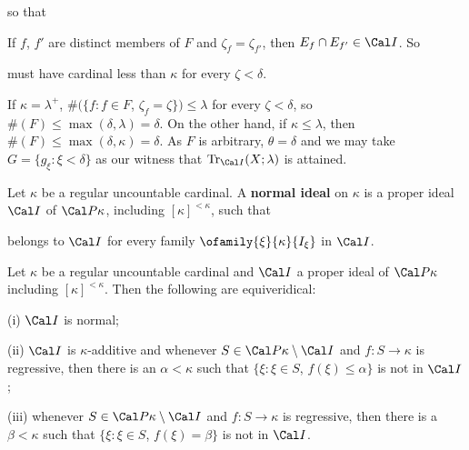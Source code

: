{\noindent so that


If $f$, $f'$ are distinct members of $F$ and $\zeta_f=\zeta_{f'}$,
then $E_f\cap E_{f'}\in\Cal I$.   So


\noindent must have cardinal less than $\kappa$ for every
$\zeta<\delta$.

If $\kappa=\lambda^+$, $\#(\{f:f\in F$, $\zeta_f=\zeta\})\le\lambda$ for
every $\zeta<\delta$, so $\#(F)\le\max(\delta,\lambda)=\delta$.   On the
other hand, if $\kappa\le\lambda$, then
$\#(F)\le\max(\delta,\kappa)=\delta$.   As $F$ is arbitrary,
$\theta=\delta$ and we may take $G=\{g_{\xi}:\xi<\delta\}$ as our
witness that $\Tr_{\Cal I}(X;\lambda)$ is attained.
}%

 Let $\kappa$ be a regular uncountable
cardinal.   A {\bf normal ideal} on $\kappa$ is a proper ideal $\Cal I$
of $\Cal P\kappa$, including $[\kappa]^{<\kappa}$, such that


\noindent belongs to $\Cal I$ for every family
$\ofamily{\xi}{\kappa}{I_{\xi}}$ in $\Cal I$.

 Let $\kappa$ be a regular uncountable
cardinal and $\Cal I$ a proper ideal of $\Cal P\kappa$ including
$[\kappa]^{<\kappa}$.   Then the following are equiveridical:

(i) $\Cal I$ is normal;

(ii) $\Cal I$ is $\kappa$-additive and whenever
$S\in\Cal P\kappa\setminus\Cal I$ and $f:S\to\kappa$ is regressive, then
there is an $\alpha<\kappa$ such that
$\{\xi:\xi\in S$, $f(\xi)\le\alpha\}$ is not in $\Cal I$;

(iii) whenever
$S\in\Cal P\kappa\setminus\Cal I$ and $f:S\to\kappa$ is regressive, then
there is a $\beta<\kappa$ such that
$\{\xi:\xi\in S$, $f(\xi)=\beta\}$ is not in $\Cal I$.

